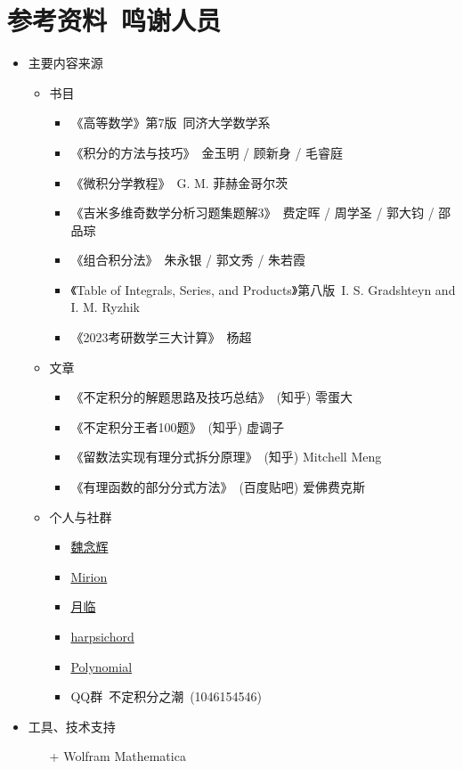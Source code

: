 \documentclass{ctexbook}
\begin{document}
{\chapter{参考资料\ 鸣谢人员}
\begin{itemize}
	\item 主要内容来源
	\begin{itemize}
		\item 书目
		\begin{itemize}
			\item 《高等数学》第7版\ 同济大学数学系
			\item 《积分的方法与技巧》\ 金玉明 / 顾新身 / 毛睿庭
			\item 《微积分学教程》\ {\selectfont G. M. }菲赫金哥尔茨
			\item 《吉米多维奇数学分析习题集题解3》\ 费定晖 / 周学圣 / 郭大钧 / 邵品琮
			\item 《组合积分法》\ 朱永银 / 郭文秀 / 朱若霞
			\item 《Table of Integrals, Series, and Products》第八版\ I. S. Gradshteyn and I. M. Ryzhik
			\item 《2023考研数学三大计算》\ 杨超
		\end{itemize}
		\item 文章
		\begin{itemize}
			\item 《不定积分的解题思路及技巧总结》\  (知乎) 零蛋大
			\item 《不定积分王者100题》\  (知乎) 虚调子
			\item 《留数法实现有理分式拆分原理》\  (知乎) Mitchell Meng
			\item 《有理函数的部分分式方法》\  (百度贴吧) 爱佛费克斯
		\end{itemize}
		\item 个人与社群
		\begin{itemize}
			\item \underline{魏念辉}
			\item \underline{Mirion}
			\item \underline{月临}
			\item \underline{harpsichord}
			\item \underline{Polynomial}
			\item QQ群\ 不定积分之潮\  (1046154546) 
		\end{itemize}
	\end{itemize}
	\item 工具、技术支持
	\begin{itemize}
		\item[+] Wolfram Mathematica

\end{itemize}
\end{itemize}}
\end{document}
